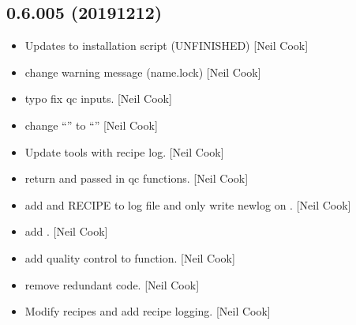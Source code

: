 \documentclass[a4paper,10pt,english]{report}
\begin{document}
\subsection{0.6.005 (2019\sphinxhyphen{}12\sphinxhyphen{}12)}
\label{\detokenize{misc/changelog:id33}}\begin{itemize}
\item {} 
Updates to installation script (UNFINISHED) {[}Neil Cook{]}

\item {} 
 \sphinxhyphen{} change warning message (name.lock) {[}Neil Cook{]}

\item {} 
 \sphinxhyphen{} typo fix qc inputs. {[}Neil Cook{]}

\item {} 
 \sphinxhyphen{} change “\sphinxhyphen{}” to “\textendash{}” {[}Neil Cook{]}

\item {} 
Update tools with recipe log. {[}Neil Cook{]}

\item {} 
 \sphinxhyphen{} return  and passed in qc
functions. {[}Neil Cook{]}

\item {} 
 \sphinxhyphen{} add  and RECIPE to log file and only write
newlog on . {[}Neil Cook{]}

\item {} 
 \sphinxhyphen{} add . {[}Neil Cook{]}

\item {} 
 \sphinxhyphen{} add quality control to function.
{[}Neil Cook{]}

\item {} 
 \sphinxhyphen{} remove redundant code. {[}Neil Cook{]}

\item {} 
Modify recipes and add recipe logging. {[}Neil Cook{]}

\end{itemize}
\end{document}
